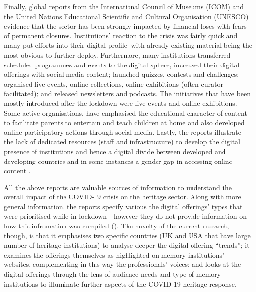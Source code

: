\documentclass{egpubl}
\begin{document}
Finally, global reports from the International Council of Museums (ICOM) and the United Nations Educational Scientific and Cultural Organisation (UNESCO) evidence that the sector has been strongly impacted by financial loses with fears of permanent closures. Institutions' reaction to the crisis was fairly quick and many put efforts into their digital profile, with already existing material being the most obvious to further deploy. Furthermore, many institutions transferred scheduled programmes and events to the digital sphere; increased their digital offerings with social media content; launched quizzes, contests and challenges; organised live events, online collections, online exhibitions (often curator facilitated); and released newsletters and podcasts. The initiatives that have  been mostly introduced after the lockdown were live events and online exhibitions. Some active organisations, have emphasised the educational character of content to facilitate parents to entertain and teach children at home and also developed online participatory actions through social media. Lastly, the reports illustrate the lack of dedicated resources (staff and infrastructure) to develop the digital presence of institutions and hence a digital divide between developed and developing countries and in some instances a gender gap in accessing online content \cite{UNESCO2020,InternationalCouncilofMuseums2020b}.

All the above reports are valuable sources of information to understand the overall impact of the COVID-19 crisis on the heritage sector. Along with more general information, the reports specify various the digital offerings' types that were prioritised while in lockdown - however they do not provide information on how this infromation was compiled (). The novelty of the current research, though, is that it emphasises two specific countries (UK and USA that have large number of heritage institutions) to analyse deeper the digital offering ``trends''; it examines the offerings themselves as highlighted on memory institutions' websites, complementing in this way the professionals' voices; and looks at the digital offerings through the lens of audience needs and type of memory institutions to illuminate further aspects of the COVID-19 heritage response.

\end{document}
